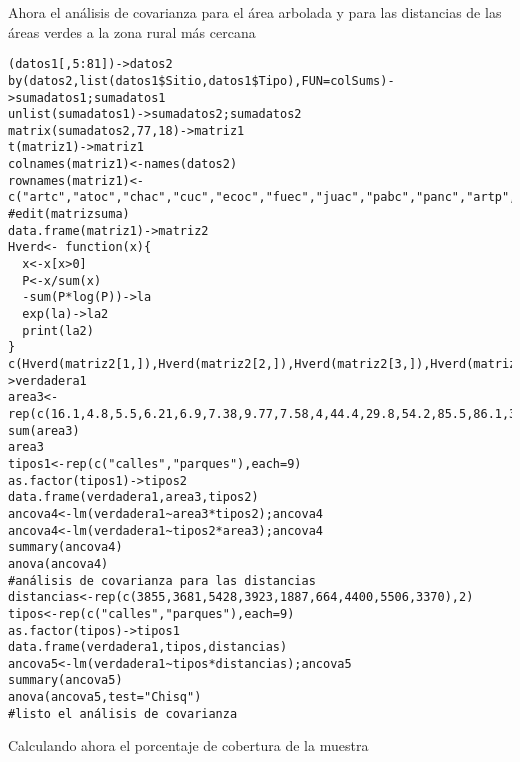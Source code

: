 \documentclass[letterpaper,12pt]{article}
\begin{document}
Ahora el análisis de covarianza para el área arbolada y para las distancias de las áreas verdes a la zona rural más cercana
\begin{lstlisting}
(datos1[,5:81])->datos2
by(datos2,list(datos1$Sitio,datos1$Tipo),FUN=colSums)->sumadatos1;sumadatos1
unlist(sumadatos1)->sumadatos2;sumadatos2
matrix(sumadatos2,77,18)->matriz1
t(matriz1)->matriz1
colnames(matriz1)<-names(datos2)
rownames(matriz1)<-c("artc","atoc","chac","cuc","ecoc","fuec","juac","pabc","panc","artp","atocp","chap","cup","ecop","fuep","juap","pabp","panp")
#edit(matrizsuma)
data.frame(matriz1)->matriz2
Hverd<- function(x){
  x<-x[x>0]
  P<-x/sum(x)
  -sum(P*log(P))->la
  exp(la)->la2
  print(la2)
}
c(Hverd(matriz2[1,]),Hverd(matriz2[2,]),Hverd(matriz2[3,]),Hverd(matriz2[4,]),Hverd(matriz2[5,]),Hverd(matriz2[6,]),Hverd(matriz2[7,]),Hverd(matriz2[8,]),Hverd(matriz2[9,]),Hverd(matriz2[10,]),Hverd(matriz2[11,]),Hverd(matriz2[12,]),Hverd(matriz2[13,]),Hverd(matriz2[14,]),Hverd(matriz2[15,]),Hverd(matriz2[16,]),Hverd(matriz2[17,]),Hverd(matriz2[18,]))->verdadera1
area3<-rep(c(16.1,4.8,5.5,6.21,6.9,7.38,9.77,7.58,4,44.4,29.8,54.2,85.5,86.1,34.5,73.7,45.3,76.8),each=1)
sum(area3)
area3
tipos1<-rep(c("calles","parques"),each=9)
as.factor(tipos1)->tipos2
data.frame(verdadera1,area3,tipos2)
ancova4<-lm(verdadera1~area3*tipos2);ancova4
ancova4<-lm(verdadera1~tipos2*area3);ancova4
summary(ancova4)
anova(ancova4)
#análisis de covarianza para las distancias
distancias<-rep(c(3855,3681,5428,3923,1887,664,4400,5506,3370),2)
tipos<-rep(c("calles","parques"),each=9)
as.factor(tipos)->tipos1
data.frame(verdadera1,tipos,distancias)
ancova5<-lm(verdadera1~tipos*distancias);ancova5
summary(ancova5)
anova(ancova5,test="Chisq")
#listo el análisis de covarianza
\end{lstlisting}
Calculando ahora el porcentaje de cobertura de la muestra
\end{document}
